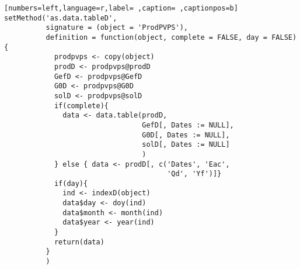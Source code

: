 \begin{lstlisting}[numbers=left,language=r,label= ,caption= ,captionpos=b]
setMethod('as.data.tableD',
          signature = (object = 'ProdPVPS'),
          definition = function(object, complete = FALSE, day = FALSE){
            prodpvps <- copy(object)
            prodD <- prodpvps@prodD
            GefD <- prodpvps@GefD
            G0D <- prodpvps@G0D
            solD <- prodpvps@solD
            if(complete){
              data <- data.table(prodD,
                                 GefD[, Dates := NULL],
                                 G0D[, Dates := NULL],
                                 solD[, Dates := NULL]
                                 )
            } else { data <- prodD[, c('Dates', 'Eac',
                                       'Qd', 'Yf')]}
            if(day){
              ind <- indexD(object)
              data$day <- doy(ind)
              data$month <- month(ind)
              data$year <- year(ind)
            }
            return(data)
          }
          )
\end{lstlisting}
